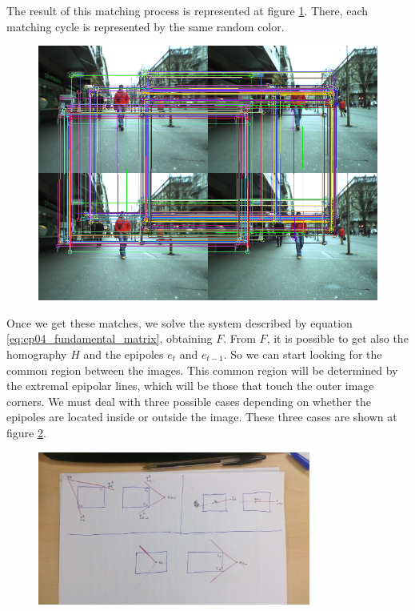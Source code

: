 The result of this matching process is represented at figure \ref{fig:cp04_polar_fund_matrix_computation}. There, each matching cycle is represented by the same random color.
\begin{figure}[h!]
\centering
\includegraphics{fundamentalMatrixComputation}
\label{fig:cp04_polar_fund_matrix_computation}
\end{figure}

Once we get these matches, we solve the system described by equation \ref{eq:cp04_fundamental_matrix}, obtaining $F$. From $F$, it is possible to get also the homography $H$ and the epipoles $e_t$ and $e_{t-1}$. So we can start looking for the common region between the images. This common region will be determined by the extremal epipolar lines, which will be those that touch the outer image corners. We must deal with three possible cases depending on
whether the epipoles are located inside or outside the image. These three cases are shown at figure \ref{fig:cp04_polar_common_region}.

\begin{figure}[h!]
\centering
\includegraphics[width=0.8\textwidth]{polar_common_region}
\label{fig:cp04_polar_common_region}
\end{figure}

